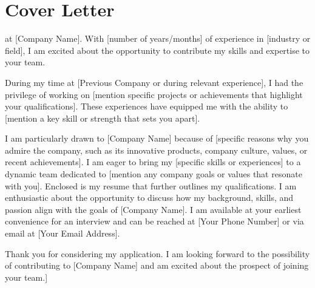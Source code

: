 \section{Cover Letter}

\lipsum[I am writing to express my interest in the [Position Title] at [Company Name]. With [number of years/months] of experience in [industry or field], I am excited about the opportunity to contribute my skills and expertise to your team.

During my time at [Previous Company or during relevant experience], I had the privilege of working on [mention specific projects or achievements that highlight your qualifications]. These experiences have equipped me with the ability to [mention a key skill or strength that sets you apart].

I am particularly drawn to [Company Name] because of [specific reasons why you admire the company, such as its innovative products, company culture, values, or recent achievements]. I am eager to bring my [specific skills or experiences] to a dynamic team dedicated to [mention any company goals or values that resonate with you].
Enclosed is my resume that further outlines my qualifications. I am enthusiastic about the opportunity to discuss how my background, skills, and passion align with the goals of [Company Name]. I am available at your earliest convenience for an interview and can be reached at [Your Phone Number] or via email at [Your Email Address].

Thank you for considering my application. I am looking forward to the possibility of contributing to [Company Name] and am excited about the prospect of joining your team.]\par
